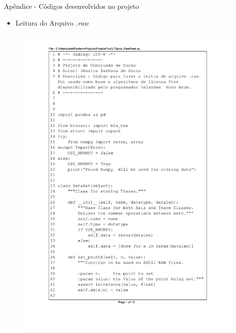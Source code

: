 
\graphicspath{ {./01_Pre_textuais/code/} }



\appendix


    Apêndice - Códigos desenvolvidos no projeto
    \begin{itemize}
        \item Leitura do Arquivo \textit{.raw}
    \end{itemize}

\begin{figure}[H]
\centering
\includegraphics[scale=0.75]{01_Pre_textuais/code/leitura1.pdf}
\end{figure}
\newpage

